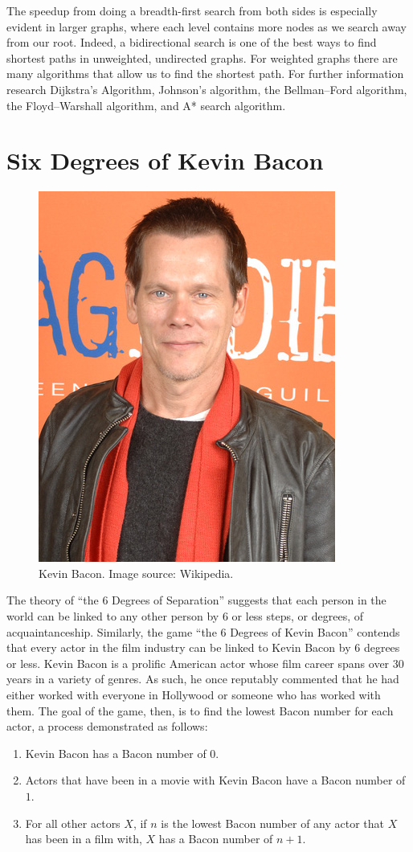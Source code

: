 The speedup from doing a breadth-first search from both sides is especially evident in larger graphs, where each level
contains more nodes as we search away from our root. Indeed, a bidirectional search is one of the best ways to find shortest
paths in unweighted, undirected graphs. For weighted graphs there are many algorithms
that allow us to find the shortest path. For further information research Dijkstra's Algorithm, Johnson's algorithm, the Bellman--Ford algorithm, the Floyd--Warshall algorithm, and A* search algorithm.

\section*{Six Degrees of Kevin Bacon}
\begin{figure}
\includegraphics[scale = .4]{Kevin_Bacon.jpg}
\caption{Kevin Bacon.  Image source: Wikipedia.}
\end{figure}

The theory of ``the 6 Degrees of Separation'' suggests that each person in the world can be linked to any other person by 6 or less steps, or degrees, of acquaintanceship.
Similarly, the game ``the 6 Degrees of Kevin Bacon'' contends that every actor in the film industry can be linked to Kevin Bacon by 6 degrees or less. Kevin Bacon
is a prolific American actor whose film career spans over 30 years in a variety of genres. As such, he once reputably commented that he had either worked with everyone in
Hollywood or someone who has worked with them. The goal of the game, then, is to find the lowest Bacon number for each actor, a process demonstrated as follows:
\begin{enumerate}
\item Kevin Bacon has a Bacon number of $0$.
\item Actors that have been in a movie with Kevin Bacon have a Bacon number of $1$.
\item For all other actors $X$, if $n$ is the lowest Bacon number of any actor that $X$ has been in a film with, $X$ has a Bacon number of $n+1$.
\end{enumerate}


